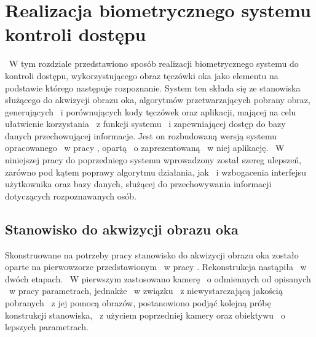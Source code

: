 \chapter{Realizacja biometrycznego systemu kontroli dostępu}
\label{cha:realizacja}
~W tym rozdziale przedstawiono sposób realizacji biometrycznego systemu do kontroli dostępu, wykorzystującego obraz tęczówki oka jako elementu na podstawie którego następuje rozpoznanie. System ten składa się ze stanowiska służącego do akwizycji obrazu oka, algorytmów przetwarzających pobrany obraz, generujących ~i porównujących kody tęczówek oraz aplikacji, mającej na celu ułatwienie korzystania ~z funkcji systemu ~i zapewniającej dostęp do bazy danych przechowującej informacje. Jest on rozbudowaną wersją systemu opracowanego ~w pracy \cite{Gl11}, opartą ~o zaprezentowaną ~w niej aplikację. ~W niniejszej pracy do poprzedniego systemu wprowadzony został szereg ulepszeń, zarówno pod kątem poprawy algorytmu działania, jak ~i wzbogacenia interfejsu użytkownika oraz bazy danych, służącej do przechowywania informacji dotyczących rozpoznawanych osób.

\section{Stanowisko do akwizycji obrazu oka}
\label{sec:stanowisko}
Skonstruowane na potrzeby pracy stanowisko do akwizycji obrazu oka zostało oparte na pierwowzorze przedstawionym ~w pracy \cite{Gl11}. Rekonstrukcja nastąpiła ~w dwóch etapach. ~W pierwszym zastosowano kamerę ~o odmiennych od opisanych ~w pracy \cite{Gl11} parametrach, jednakże ~w związku ~z niewystarczającą jakością pobranych ~z jej pomocą obrazów, postanowiono podjąć kolejną próbę konstrukcji stanowiska, ~z użyciem poprzedniej kamery oraz obiektywu ~o lepszych parametrach.

